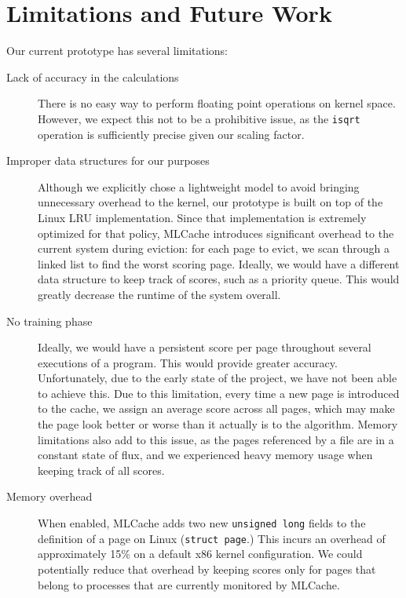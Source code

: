 \section{Limitations and Future Work}
Our current prototype has several limitations:

\begin{description}
  \item[Lack of accuracy in the calculations] There is no easy way to perform
    floating point operations on kernel space. However, we expect this not to
    be a prohibitive issue, as the \texttt{isqrt} operation is sufficiently
    precise given our scaling factor.

  \item[Improper data structures for our purposes] Although we explicitly chose
    a lightweight model to avoid bringing unnecessary overhead to the kernel,
    our prototype is built on top of the Linux LRU implementation. Since that
    implementation is extremely optimized for that policy, MLCache introduces
    significant overhead to the current system during eviction: for each page
    to evict, we scan through a linked list to find the worst scoring page.
    Ideally, we would have a different data structure to keep track of scores,
    such as a priority queue. This would greatly decrease the runtime of the system
    overall.

  \item[No training phase] Ideally, we would have a persistent score per page
    throughout several executions of a program. This would provide greater
    accuracy. Unfortunately, due to the early state of the project, we have not
    been able to achieve this. Due to this limitation, every time a new page is
    introduced to the cache, we assign an average score across all pages, which
    may make the page look better or worse than it actually is to the
    algorithm. Memory limitations also add to this issue, as the pages
    referenced by a file are in a constant state of flux, and we
    experienced heavy memory usage when keeping track of all scores.

  \item[Memory overhead] When enabled, MLCache adds two new \texttt{unsigned long}
    fields to the definition of a page on Linux (\texttt{struct page}.) This
    incurs an overhead of approximately 15\% on a default x86 kernel configuration.
    We could potentially reduce that overhead by keeping scores only for pages
    that belong to processes that are currently monitored by MLCache.

\end{description}

